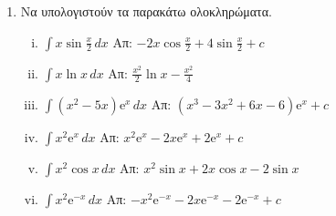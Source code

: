 




\pagestyle{askhseis}
\everymath{\displaystyle}



\begin{center}
\minibox{\large\bfseries \textcolor{Col1}{Ολοκλήρωμα}}
\end{center}

\vspace{\baselineskip}

\begin{enumerate}
  \item Να υπολογιστούν τα παρακάτω ολοκληρώματα.
    \begin{enumerate}[i)]
      \item $ \int x \sin{\frac{x}{2}} \,{dx} $ 
        \hfill Απ: $ -2x \cos{\frac{x}{2}} + 4 \sin{\frac{x}{2}} +c $
      \item $ \int x \ln{x} \,{dx} $ 
        \hfill Απ: $ \frac{x^{2}}{2} \ln{x} - \frac{x^{2}}{4} $ 
      \item $ \int (x^{2}-5x) \mathrm{e}^{x} \,{dx} $ 
        \hfill Απ: $ (x^{3}-3x^{2}+6x-6) \mathrm{e}^{x} + c  $  
      \item $ \int x^{2} \mathrm{e}^{x} \,{dx} $ 
        \hfill Απ: $ x^{2} \mathrm{e}^{x} -2 x \mathrm{e}^{x} + 2 \mathrm{e}^{x} + c $
      \item $ \int x^{2} \cos{x} \,{dx} $ 
        \hfill Απ: $ x^{2} \sin{x} + 2 x \cos{x} - 2 \sin{x} $ 
      \item $ \int x^{2} \mathrm{e}^{-x} \,{dx} $
        \hfill Απ: $ -x^{2} \mathrm{e}^{-x} -2 x \mathrm{e}^{-x}-2 \mathrm{e}^{-x}+c$ 
    \end{enumerate}
\end{enumerate}


